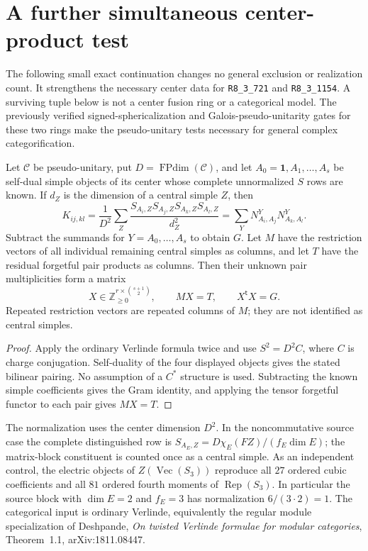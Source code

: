 \section{A further simultaneous center-product test}
\label{sec:center-product-followup}

The following small exact continuation changes no general exclusion or
realization count.  It strengthens the necessary center data for
\texttt{R8\_3\_721} and \texttt{R8\_3\_1154}.  A surviving tuple below
is not a center fusion ring or a categorical model.  The previously
verified signed-sphericalization and Galois-pseudo-unitarity gates for
these two rings make the pseudo-unitary tests necessary for general
complex categorification.

\begin{lemma}
\label{lem:followup-pair-gram}
Let $\mathcal C$ be pseudo-unitary, put $D=\operatorname{FPdim}(\mathcal C)$,
and let $A_0=\mathbf1,A_1,\ldots,A_s$ be self-dual simple objects of its
center whose complete unnormalized $S$ rows are known.  If $d_Z$ is the
dimension of a central simple $Z$, then
\[
 K_{ij,kl}=\frac1{D^2}\sum_Z
 \frac{S_{A_i,Z}S_{A_j,Z}S_{A_k,Z}S_{A_l,Z}}{d_Z^2}
 =\sum_Y N_{A_i,A_j}^{Y}N_{A_k,A_l}^{Y}.
\]
Subtract the summands for $Y=A_0,\ldots,A_s$ to obtain $G$.
Let $M$ have the restriction vectors of all individual remaining central
simples as columns, and let $T$ have the residual forgetful pair products
as columns.  Then their unknown pair multiplicities form a matrix
\[
             X\in\mathbb Z_{\ge0}^{r\times\binom{s+1}{2}},
             \qquad MX=T,\qquad X^{\mathsf t}X=G.
\]
Repeated restriction vectors are repeated columns of $M$; they are not
identified as central simples.
\end{lemma}

\begin{proof}
Apply the ordinary Verlinde formula twice and use
$S^2=D^2C$, where $C$ is charge conjugation.  Self-duality of the four
displayed objects gives the stated bilinear pairing.  No assumption
of a $C^*$ structure is used.  Subtracting the known simple coefficients
gives the Gram identity, and applying the tensor forgetful functor to
each pair gives $MX=T$.
\end{proof}

The normalization uses the center dimension $D^2$.  In the
noncommutative source case the complete distinguished row is
$S_{A_E,Z}=D\chi_E(FZ)/(f_E\dim E)$; the matrix-block constituent is
counted once as a central simple.  As an independent control, the
electric objects of $Z(\operatorname{Vec}(S_3))$ reproduce all $27$
ordered cubic coefficients and all $81$ ordered fourth moments of
$\operatorname{Rep}(S_3)$.  In particular the source block with
$\dim E=2$ and $f_E=3$ has normalization $6/(3\cdot2)=1$.
The categorical input is ordinary Verlinde, equivalently the regular
module specialization of Deshpande, \emph{On twisted Verlinde formulae
for modular categories}, Theorem~1.1, arXiv:1811.08447.

